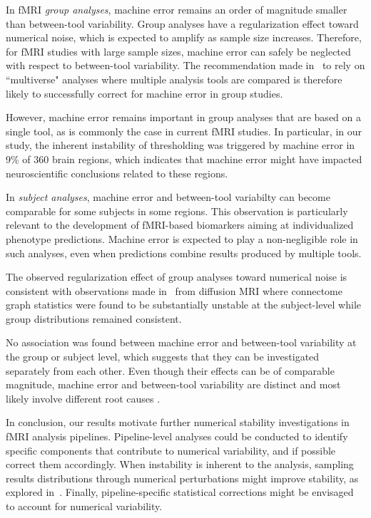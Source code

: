 \documentclass[conference]{IEEEtran}
\begin{document}
In fMRI \emph{group analyses}, machine error remains an order of magnitude
smaller than between-tool variability. Group analyses have a regularization
effect toward numerical noise, which is expected to amplify as sample size
increases. Therefore, for fMRI studies with large sample sizes, machine
error can safely be neglected with respect to between-tool variability. The
recommendation made in~\cite{botvinik2020variability} to rely on ``multiverse" analyses where
multiple analysis tools are compared is therefore likely to successfully correct
for machine error in group studies.

However, machine error remains important in group analyses that are based
on a single tool, as is commonly the case in current fMRI studies. In
particular, in our study, the inherent instability of thresholding was
triggered by machine error in 9\% of 360 brain regions, which indicates
that machine error might have impacted neuroscientific conclusions related
to these regions. 

In \emph{subject analyses}, machine error and between-tool variabilty can
become comparable for some subjects in some regions. This observation is particularly
relevant to the development of fMRI-based biomarkers aiming at
individualized phenotype predictions. Machine error is expected to play
a non-negligible role in such analyses, even when predictions combine
results produced by multiple tools.

The observed regularization effect of group analyses toward numerical noise 
is consistent with observations made in~\cite{kiar2020numerical} from diffusion MRI where 
connectome graph statistics were found to be substantially unstable at the subject-level 
while group distributions remained consistent. 


No association was found between
machine error and between-tool variability at the group or subject level,
which suggests that they can be investigated separately from each other.
Even though their effects can be of comparable magnitude, machine error and
between-tool variability are distinct and most likely involve different
root causes .

In conclusion, our results motivate further numerical stability
investigations in fMRI analysis pipelines. Pipeline-level analyses could be
conducted to identify specific components that contribute to numerical
variability, and if possible correct them accordingly. When instability is
inherent to the analysis, sampling results distributions through numerical
perturbations might improve stability, as explored in~\cite{kiar2021data}.
Finally, pipeline-specific statistical corrections might be envisaged to
account for numerical variability.







\end{document}

